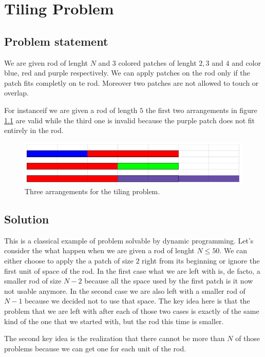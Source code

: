 \chapter{Tiling Problem}
\section{Problem statement}
We are given rod of lenght $N$ and $3$  colored patches of lenght $2,3$ and $4$ and color blue, red and purple respectively. We can apply patches on the rod only if the patch fits completly on te rod. Moreover two patches are not allowed to touch or overlap.

For instanceif we are given a rod of length $5$ the first two arrangements in figure \ref{fig:tiling:example_solution} are valid while the third one is invalid because the purple patch does not fit entirely in the rod.
\begin{figure}
	\label{fig:tiling:example_solution}
	\centering
	\includegraphics[width=\textwidth]{../problems/tiling_problem/solutions}
	\caption{Three arrangements for the tiling problem.}
\end{figure}

\section{Solution}
This is a classical example of problem solvable by dynamic programming. Let's consider the what happen when we are given a rod of lenght $N \leq 50$.
We can either choose to apply the a patch of size $2$ right from its beginning or ignore the first unit of space of the rod.
In the first case what we are left with is, de facto, a smaller rod of size $N-2$ because all the space used by the first patch is it now not usable anymore.
In the second case we are also left with a smaller rod of $N-1$ because we decided not to use that space. The key idea here is that the problem that we are left with after each of those two cases is exactly of the same kind of the one that we started with, but the rod this time is smaller. 

The second key idea is the realization that there cannot be more than $N$ of those problems because we can get one for each unit of the rod. 

